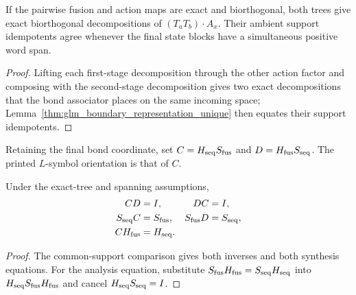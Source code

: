 \begin{lemma}
    \label{thm:glm_boundary_exact_action_trees}
    \leanok
    If the pairwise fusion and action maps are exact and biorthogonal,
    both trees give exact biorthogonal decompositions of $(T_aT_b)\cdot A_x$.
    Their ambient support idempotents agree whenever the final state blocks
    have a simultaneous positive word span.
\end{lemma}
\begin{proof}
    \leanok
    Lifting each first-stage decomposition through the other action factor and
    composing with the second-stage decomposition gives two exact
    decompositions that the bond associator places on the same incoming space;
    Lemma~\ref{thm:glm_boundary_representation_unique} then equates their
    support idempotents.
\end{proof}

\begin{definition}
    \label{def:glm_boundary_action_comparison}
    \leanok
    Retaining the final bond coordinate, set
    $C=H_{\rm seq}S_{\rm fus}$ and $D=H_{\rm fus}S_{\rm seq}$.
    The printed $L$-symbol orientation is that of $C$.
\end{definition}

\begin{lemma}
    \label{thm:glm_boundary_action_comparison}
    \leanok
    Under the exact-tree and spanning assumptions,
    \begin{align}
        CD           & =I,           & DC           & =I,           \\
        S_{\rm seq}C & =S_{\rm fus}, & S_{\rm fus}D & =S_{\rm seq}, \\
        CH_{\rm fus} & =H_{\rm seq}.
        \label{eq:glm_boundary_action_comparison}
    \end{align}
\end{lemma}
\begin{proof}
    \leanok
    The common-support comparison gives both inverses and both synthesis
    equations. For the analysis equation, substitute
    $S_{\rm fus}H_{\rm fus}=S_{\rm seq}H_{\rm seq}$ into
    $H_{\rm seq}S_{\rm fus}H_{\rm fus}$ and cancel
    $H_{\rm seq}S_{\rm seq}=I$.
\end{proof}

